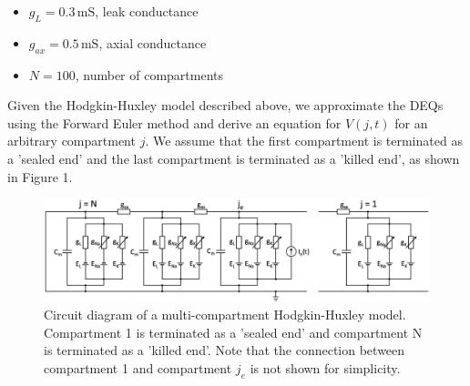 \documentclass[12pt]{article}
\begin{document}
\begin{enumerate}
\begin{itemize}
        \item $g_{L}=0.3 \, \text{mS}$, leak conductance
        \item $g_{ax}=0.5 \, \text{mS}$, axial conductance
        \item $N=100$, number of compartments
    \end{itemize}
    Given the Hodgkin-Huxley model described above, we approximate the DEQs using the Forward Euler method and 
    derive an equation for $V(j, t)$ for an arbitrary compartment $j$. We assume that the first compartment is 
    terminated as a 'sealed end' and the last compartment is terminated as a 'killed end', as shown in Figure 1.
    \begin{figure}[h]
        \centering
        \includegraphics[width=1\textwidth]{Circuit_final.png}
        \caption{Circuit diagram of a multi-compartment Hodgkin-Huxley model. Compartment 1 is terminated as a 'sealed end' and 
        compartment N is terminated as a 'killed end'. Note that the connection between compartment 1 and compartment $j_{e}$ is not 
        shown for simplicity.}
    \end{figure}
\end{enumerate}
\end{document}
